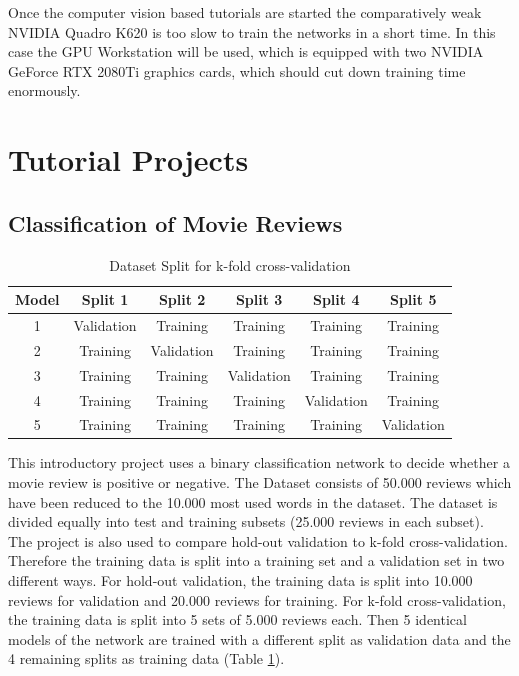 \documentclass[sigconf, nonacm]{acmart}
\begin{document}
Once the computer vision based tutorials are started the comparatively weak NVIDIA Quadro K620 is too slow to train the networks in a short time.
In this case the GPU Workstation will be used, which is equipped with two NVIDIA GeForce RTX 2080Ti graphics cards, which should cut down training time enormously.

\section{Tutorial Projects}
\subsection{Classification of Movie Reviews}

\begin{table}[h!]
  \caption{Dataset Split for k-fold cross-validation}
  \label{tab:k-fold}
  \begin{tabular}{ c c c c c c }
    \toprule
    Model & Split 1 & Split 2 & Split 3 & Split 4 & Split 5 \\
    \midrule
    1 & Validation & Training & Training & Training & Training \\
    2 & Training & Validation & Training & Training & Training \\
	3 & Training & Training & Validation & Training & Training \\
	4 & Training & Training & Training & Validation & Training \\
	5 & Training & Training & Training & Training & Validation \\
  	\bottomrule
  \end{tabular}
\end{table}

This introductory project uses a binary classification network to decide whether a movie review is positive or negative.
The Dataset consists of 50.000 reviews which have been reduced to the 10.000 most used words in the dataset.
The dataset is divided equally into test and training subsets (25.000 reviews in each subset).
The project is also used to compare hold-out validation to k-fold cross-validation.
Therefore the training data is split into a training set and a validation set in two different ways.
For hold-out validation, the training data is split into 10.000 reviews for validation and 20.000 reviews for training.
For k-fold cross-validation, the training data is split into 5 sets of 5.000 reviews each.
Then 5 identical models of the network are trained with a different split as validation data and the 4 remaining splits as training data (Table \ref{tab:k-fold}).
\end{document}

